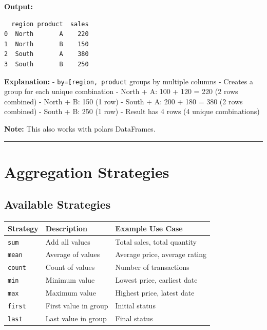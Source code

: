 \documentclass[
  letterpaper,
]{scrbook}
\begin{document}
\textbf{Output:}

\begin{verbatim}
  region product  sales
0  North       A    220
1  North       B    150
2  South       A    380
3  South       B    250
\end{verbatim}

\textbf{Explanation:} -
\texttt{by={[}\textquotesingle{}region\textquotesingle{},\ \textquotesingle{}product\textquotesingle{}{]}}
groups by multiple columns - Creates a group for each unique combination
- North + A: 100 + 120 = 220 (2 rows combined) - North + B: 150 (1 row)
- South + A: 200 + 180 = 380 (2 rows combined) - South + B: 250 (1 row)
- Result has 4 rows (4 unique combinations)

\textbf{Note:} This also works with polars DataFrames.

\begin{center}\rule{0.5\linewidth}{0.5pt}\end{center}

\section{Aggregation Strategies}\label{aggregation-strategies}

\subsection{Available Strategies}\label{available-strategies}

\begin{longtable}[]{@{}lll@{}}
\toprule\noalign{}
Strategy & Description & Example Use Case \\
\midrule\noalign{}
\endhead
\bottomrule\noalign{}
\endlastfoot
\texttt{\textquotesingle{}sum\textquotesingle{}} & Add all values &
Total sales, total quantity \\
\texttt{\textquotesingle{}mean\textquotesingle{}} & Average of values &
Average price, average rating \\
\texttt{\textquotesingle{}count\textquotesingle{}} & Count of values &
Number of transactions \\
\texttt{\textquotesingle{}min\textquotesingle{}} & Minimum value &
Lowest price, earliest date \\
\texttt{\textquotesingle{}max\textquotesingle{}} & Maximum value &
Highest price, latest date \\
\texttt{\textquotesingle{}first\textquotesingle{}} & First value in
group & Initial status \\
\texttt{\textquotesingle{}last\textquotesingle{}} & Last value in group
& Final status \\
\end{longtable}
\end{document}
